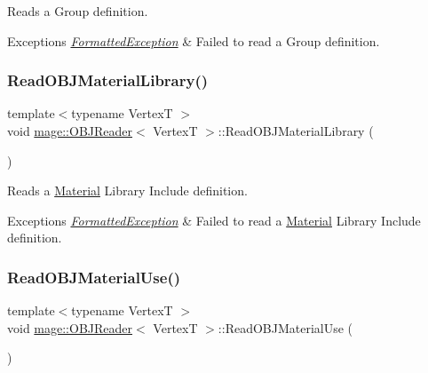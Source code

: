 Reads a Group definition.


\begin{DoxyExceptions}{Exceptions}
{\em \hyperlink{classmage_1_1_formatted_exception}{Formatted\+Exception}} & Failed to read a Group definition. \\
\hline
\end{DoxyExceptions}
\hypertarget{classmage_1_1_o_b_j_reader_abc1f67436e50230bd2071b2dc31a4689}{}\label{classmage_1_1_o_b_j_reader_abc1f67436e50230bd2071b2dc31a4689} 
\subsubsection{\texorpdfstring{Read\+O\+B\+J\+Material\+Library()}{ReadOBJMaterialLibrary()}}
{\footnotesize\ttfamily template$<$typename VertexT $>$ \\
void \hyperlink{classmage_1_1_o_b_j_reader}{mage\+::\+O\+B\+J\+Reader}$<$ VertexT $>$\+::Read\+O\+B\+J\+Material\+Library (\begin{DoxyParamCaption}{ }\end{DoxyParamCaption})\hspace{0.3cm}{\ttfamily [private]}}

Reads a \hyperlink{classmage_1_1_material}{Material} Library Include definition.


\begin{DoxyExceptions}{Exceptions}
{\em \hyperlink{classmage_1_1_formatted_exception}{Formatted\+Exception}} & Failed to read a \hyperlink{classmage_1_1_material}{Material} Library Include definition. \\
\hline
\end{DoxyExceptions}
\hypertarget{classmage_1_1_o_b_j_reader_aa4c73ff0e5e3de40cacbebc189037802}{}\label{classmage_1_1_o_b_j_reader_aa4c73ff0e5e3de40cacbebc189037802} 
\subsubsection{\texorpdfstring{Read\+O\+B\+J\+Material\+Use()}{ReadOBJMaterialUse()}}
{\footnotesize\ttfamily template$<$typename VertexT $>$ \\
void \hyperlink{classmage_1_1_o_b_j_reader}{mage\+::\+O\+B\+J\+Reader}$<$ VertexT $>$\+::Read\+O\+B\+J\+Material\+Use (\begin{DoxyParamCaption}{ }\end{DoxyParamCaption})\hspace{0.3cm}{\ttfamily [private]}}

